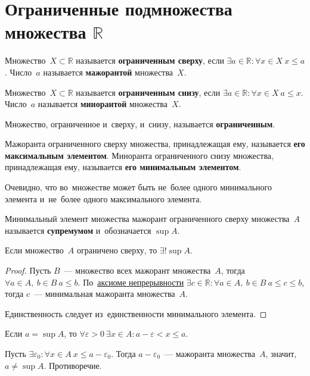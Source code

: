 \section{Ограниченные подмножества множества \texorpdfstring{$\mathbb R$}{}}
\hypertarget{def:bounded_set}{}\hypertarget{def:majorant}{} Множество~$X \subset \mathbb R$ называется \textbf{ограниченным сверху}, если $\exists a \in \mathbb R \colon \forall x \in X \ x \leqslant a$.
Число~$a$ называется \textbf{мажорантой} множества~$X$.

\hypertarget{def:minorant}{} Множество~$X \subset \mathbb R$ называется \textbf{ограниченным снизу}, если $\exists a \in \mathbb R \colon \forall x \in X \ a \leqslant x$.
Число~$a$ называется \textbf{минорантой} множества~$X$.

Множество, ограниченное и~сверху, и~снизу, называется \textbf{ограниченным}.

Мажоранта ограниченного сверху множества, принадлежащая ему, называется \textbf{его максимальным элементом}.
Миноранта ограниченного снизу множества, принадлежащая ему, называется \textbf{его минимальным элементом}.

Очевидно, что во~множестве может быть не~более одного минимального элемента и~не~более одного максимального элемента.

\hypertarget{def:supremum}{} Минимальный элемент множества мажорант ограниченного сверху множества~$A$ называется \textbf{супремумом} и~обозначается $\sup A$.

\begin{statement}
\label{st:single_supremum}
Если множество~$A$ ограничено сверху, то $\exists! \sup A$.
\end{statement}
\begin{proof}
Пусть $B$~--- множество всех мажорант множества~$A$, тогда $\forall a \in A, \ b \in B \ a \leqslant b$.
По~\hyperlink{eq:continuity_axiom}{аксиоме непрерывности} $\exists c \in \mathbb R \colon \forall a \in A, \ b \in B \ a \leqslant c \leqslant b$, тогда $c$~--- минимальная мажоранта множества~$A$.

Единственность следует из~единственности минимального элемента.
\end{proof}

\begin{statement}
\label{st:inequality_of_supremum}
Если $a = \sup A$, то $\forall \varepsilon > 0 \ \exists x \in A \colon a - \varepsilon < x \leqslant a$.
\end{statement}
\begin{proofcontra}
Пусть $\exists \varepsilon_0 \colon \forall x \in A \ x \leqslant a - \varepsilon_0$.
Тогда $a - \varepsilon_0$~--- мажоранта множества~$A$, значит, $a \neq \sup A$.
Противоречие.
\end{proofcontra}

